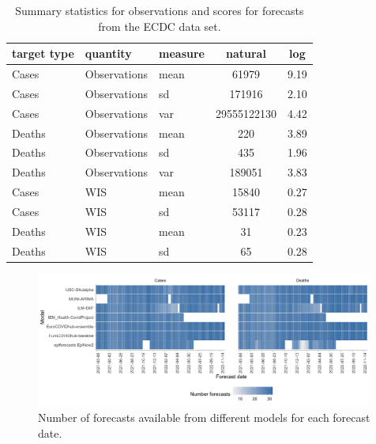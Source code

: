 \documentclass{article}
\begin{document}
\begin{table}[h!]
    \centering
\begin{tabular}{lllcc}
\toprule
target type & quantity & measure & natural & log\\
\midrule
Cases & Observations & mean & 61979 & 9.19\\
Cases & Observations & sd & 171916 & 2.10\\
Cases & Observations & var & 29555122130 & 4.42\\
Deaths & Observations & mean & 220 & 3.89\\
Deaths & Observations & sd & 435 & 1.96\\
\addlinespace
Deaths & Observations & var & 189051 & 3.83\\
Cases & WIS & mean & 15840 & 0.27\\
Cases & WIS & sd & 53117 & 0.28\\
Deaths & WIS & mean & 31 & 0.23\\
Deaths & WIS & sd & 65 & 0.28\\
\bottomrule
\end{tabular}
    \caption{Summary statistics for observations and scores for forecasts from the ECDC data set.}
    \label{tab:HUB-summary}
\end{table}

\begin{figure}[h!]
    \centering
    \includegraphics[width=0.99\textwidth]{output/figures/number-avail-forecasts.png}
    \caption{
    Number of forecasts available from different models for each forecast date. 
    }
    \label{fig:HUB-num-avail-models}
\end{figure}
\end{document}
